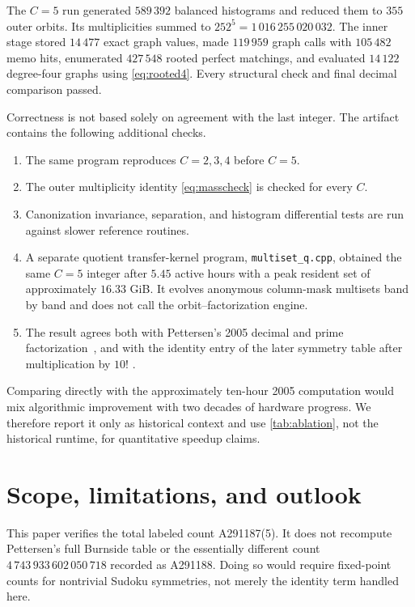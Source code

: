 \documentclass[11pt]{article}
\theoremstyle{definition}
\theoremstyle{remark}
\begin{document}
The $C=5$ run generated $589\,392$ balanced histograms and reduced them to
$355$ outer orbits.  Its multiplicities summed to
$252^5=1\,016\,255\,020\,032$.  The inner stage stored $14\,477$ exact graph
values, made $119\,959$ graph calls with $105\,482$ memo hits, enumerated
$427\,548$ rooted perfect matchings, and evaluated $14\,122$ degree-four
graphs using \eqref{eq:rooted4}.  Every structural check and final decimal
comparison passed.

Correctness is not based solely on agreement with the last integer.
The artifact contains the following additional checks.

\begin{enumerate}
  \item The same program reproduces $C=2,3,4$ before $C=5$.
  \item The outer multiplicity identity \eqref{eq:masscheck} is checked for
        every $C$.
  \item Canonization invariance, separation, and histogram differential tests
        are run against slower reference routines.
  \item A separate quotient transfer-kernel program, \texttt{multiset\_q.cpp},
        obtained the same $C=5$ integer after $5.45$ active hours with a peak
        resident set of approximately $16.33$ GiB.  It evolves anonymous
        column-mask multisets band by band and does not call the
        orbit--factorization engine.
  \item The result agrees both with Pettersen's 2005 decimal and prime
        factorization~\cite{pettersen2005c5}, and with the identity entry of
        the later symmetry table after multiplication by $10!$
        \cite{pettersen2008symmetry}.
\end{enumerate}

Comparing directly with the approximately ten-hour 2005 computation would
mix algorithmic improvement with two decades of hardware progress.  We
therefore report it only as historical context and use \cref{tab:ablation},
not the historical runtime, for quantitative speedup claims.

\section{Scope, limitations, and outlook}

This paper verifies the total labeled count A291187(5).  It does not recompute
Pettersen's full Burnside table or the essentially different count
$4\,743\,933\,602\,050\,718$ recorded as A291188.  Doing so would require
fixed-point counts for nontrivial Sudoku symmetries, not merely the identity
term handled here.
\end{document}
